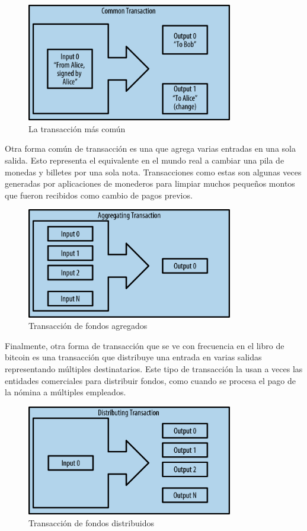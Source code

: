 \documentclass[10pt,journal,compsoc]{IEEEtran}
\begin{document}
\begin{figure}[h]
    \center
    \includegraphics[width=9cm]{trans1}
    \caption{La transacción más común}
    \label{fig:trans1}
\end{figure}

Otra forma común de transacción es una que agrega varias entradas en una sola salida. Esto representa el equivalente en el mundo real a cambiar una pila de monedas y billetes por una sola nota. Transacciones como estas son algunas veces generadas por aplicaciones de monederos para limpiar muchos pequeños montos que fueron recibidos como cambio de pagos previos.

\begin{figure}[h]
    \center
    \includegraphics[width=9cm]{trans2}
    \caption{Transacción de fondos agregados}
    \label{fig:trans2}
\end{figure}

Finalmente, otra forma de transacción que se ve con frecuencia en el libro de bitcoin es una transacción que distribuye una entrada en varias salidas representando múltiples destinatarios. Este tipo de transacción la usan a veces las entidades comerciales para distribuir fondos, como cuando se procesa el pago de la nómina a múltiples empleados.

\begin{figure}[h]
    \center
    \includegraphics[width=9cm]{trans3}
    \caption{Transacción de fondos distribuidos}
    \label{fig:trans3}
\end{figure}
\end{document}
